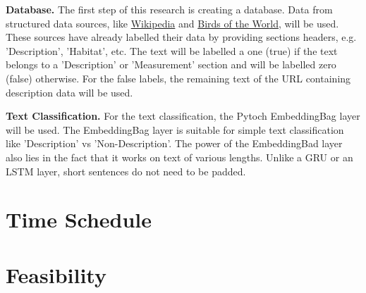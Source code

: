 \documentclass{article}
\begin{document}
\textbf{Database.}
The first step of this research is creating a database.
Data from structured data sources, like \href{http://www.Wikipedia.com}{Wikipedia} and \href{https://birdsoftheworld.org}{Birds of the World}, will be used.
These sources have already labelled their data by providing sections headers, e.g. 'Description', 'Habitat', etc.
The text will be labelled a one (true) if the text belongs to a 'Description' or 'Measurement' section and will be labelled zero (false) otherwise.
For the false labels, the remaining text of the URL containing description data will be used.

\textbf{Text Classification.}
For the text classification, the Pytoch EmbeddingBag layer will be used.
The EmbeddingBag layer is suitable for simple text classification like 'Description' vs 'Non-Description'.
The power of the EmbeddingBad layer also lies in the fact that it works on text of various lengths.
Unlike a GRU or an LSTM layer, short sentences do not need to be padded.
\section{Time Schedule}
\section{Feasibility}

\printbibliography
\end{document}
